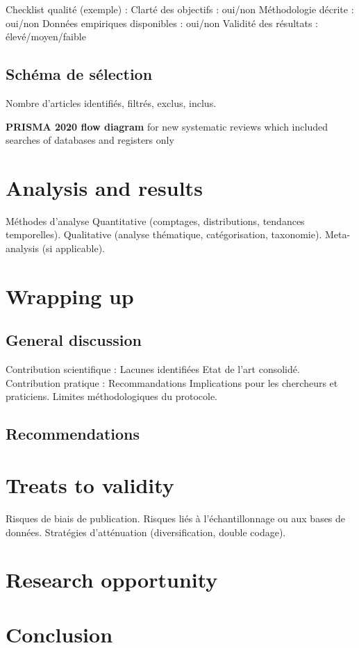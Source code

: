 \documentclass[11pt]{article}
\begin{document}
Checklist qualité (exemple) :
    Clarté des objectifs : oui/non
    Méthodologie décrite : oui/non
    Données empiriques disponibles : oui/non
    Validité des résultats : élevé/moyen/faible
\subsection{Schéma de sélection}
\label{sec:org2a6a5ac}
Nombre d’articles identifiés, filtrés, exclus, inclus.

\textbf{PRISMA 2020 flow diagram} for new systematic reviews which included searches of databases and registers only
\section{Analysis and results}
\label{sec:org7535351}
Méthodes d’analyse
    Quantitative (comptages, distributions, tendances temporelles).
    Qualitative (analyse thématique, catégorisation, taxonomie).
    Meta-analysis (si applicable).
\section{Wrapping up}
\label{sec:org651f08d}
\subsection{General discussion}
\label{sec:org6b12b93}
Contribution scientifique :
    Lacunes identifiées
    Etat de l’art consolidé.
Contribution pratique :
    Recommandations
    Implications pour les chercheurs et praticiens.
Limites méthodologiques du protocole.
\subsection{Recommendations}
\label{sec:org997fc70}
\section{Treats to validity}
\label{sec:org45a3380}
Risques de biais de publication.
Risques liés à l’échantillonnage ou aux bases de données.
Stratégies d’atténuation (diversification, double codage).
\section{Research opportunity}
\label{sec:org58a076b}

\section{Conclusion}
\label{sec:org9282ece}
\end{document}
